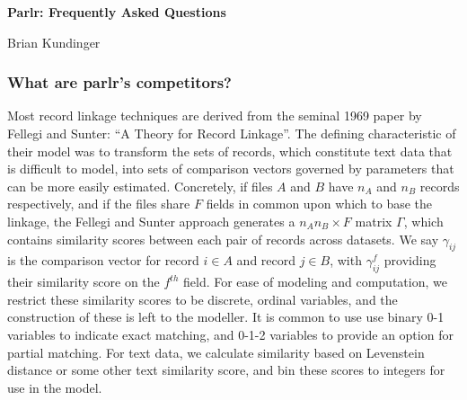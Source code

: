 \documentclass[
  12pt,
]{article}
\author{}
\date{\vspace{-2.5em}}
\begin{document}
\begin{flushright} 
    \end{flushright}
    \begin{center} \textbf{Parlr: Frequently Asked Questions}
    
    Brian Kundinger

    \end{center}

\hypertarget{what-are-parlrs-competitors}{%
\subsubsection{What are parlr's
competitors?}\label{what-are-parlrs-competitors}}

Most record linkage techniques are derived from the seminal 1969 paper
by Fellegi and Sunter: ``A Theory for Record Linkage''. The defining
characteristic of their model was to transform the sets of records,
which constitute text data that is difficult to model, into sets of
comparison vectors governed by parameters that can be more easily
estimated. Concretely, if files \(A\) and \(B\) have \(n_A\) and \(n_B\)
records respectively, and if the files share \(F\) fields in common upon
which to base the linkage, the Fellegi and Sunter approach generates a
\(n_A n_B \times F\) matrix \(\Gamma\), which contains similarity scores
between each pair of records across datasets. We say \(\gamma_{ij}\) is
the comparison vector for record \(i \in A\) and record \(j \in B\),
with \(\gamma_{ij}^f\) providing their similarity score on the
\(f^{th}\) field. For ease of modeling and computation, we restrict
these similarity scores to be discrete, ordinal variables, and the
construction of these is left to the modeller. It is common to use use
binary 0-1 variables to indicate exact matching, and 0-1-2 variables to
provide an option for partial matching. For text data, we calculate
similarity based on Levenstein distance or some other text similarity
score, and bin these scores to integers for use in the model.
\end{document}
